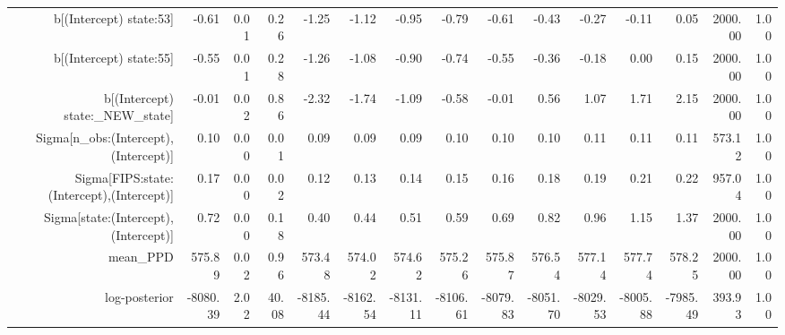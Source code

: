\begin{table}[ht]
\begin{tabular}{rrrrrrrrrrrrrrr}
  b[(Intercept) state:53] & -0.61 & 0.01 & 0.26 & -1.25 & -1.12 & -0.95 & -0.79 & -0.61 & -0.43 & -0.27 & -0.11 & 0.05 & 2000.00 & 1.00 \\ 
  b[(Intercept) state:55] & -0.55 & 0.01 & 0.28 & -1.26 & -1.08 & -0.90 & -0.74 & -0.55 & -0.36 & -0.18 & 0.00 & 0.15 & 2000.00 & 1.00 \\ 
  b[(Intercept) state:\_NEW\_state] & -0.01 & 0.02 & 0.86 & -2.32 & -1.74 & -1.09 & -0.58 & -0.01 & 0.56 & 1.07 & 1.71 & 2.15 & 2000.00 & 1.00 \\ 
  Sigma[n\_obs:(Intercept),(Intercept)] & 0.10 & 0.00 & 0.01 & 0.09 & 0.09 & 0.09 & 0.10 & 0.10 & 0.10 & 0.11 & 0.11 & 0.11 & 573.12 & 1.00 \\ 
  Sigma[FIPS:state:(Intercept),(Intercept)] & 0.17 & 0.00 & 0.02 & 0.12 & 0.13 & 0.14 & 0.15 & 0.16 & 0.18 & 0.19 & 0.21 & 0.22 & 957.04 & 1.00 \\ 
  Sigma[state:(Intercept),(Intercept)] & 0.72 & 0.00 & 0.18 & 0.40 & 0.44 & 0.51 & 0.59 & 0.69 & 0.82 & 0.96 & 1.15 & 1.37 & 2000.00 & 1.00 \\ 
  mean\_PPD & 575.89 & 0.02 & 0.96 & 573.48 & 574.02 & 574.62 & 575.26 & 575.87 & 576.54 & 577.14 & 577.74 & 578.25 & 2000.00 & 1.00 \\ 
  log-posterior & -8080.39 & 2.02 & 40.08 & -8185.44 & -8162.54 & -8131.11 & -8106.61 & -8079.83 & -8051.70 & -8029.53 & -8005.88 & -7985.49 & 393.93 & 1.00 \\ 
   \hline
\end{tabular}
\end{table}
